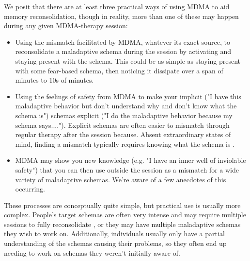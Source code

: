 \documentclass[12pt,letterpaper]{book}
\begin{document}
We posit that there are at least three practical ways of using MDMA to aid memory reconsolidation, though in reality, more than one of these may happen during any given MDMA-therapy session:
\begin{itemize}
	\item Using the mismatch facilitated by MDMA, whatever its exact source, to reconsolidate a maladaptive schema during the session by activating and staying present with the schema. This could be as simple as staying present with some fear-based schema, then noticing it dissipate over a span of minutes to 10s of minutes.
	\item Using the feelings of safety from MDMA to make your implicit ("I have this maladaptive behavior but don't understand why and don't know what the schema is") schemas explicit ("I do the maladaptive behavior because my schema says...."). Explicit schemas are often easier to mismatch through regular therapy after the session because. Absent extraordinary states of mind, finding a mismatch typically requires knowing what the schema is \cite{eckerUnlocking}.
	\item MDMA may show you new knowledge (e.g. "I have an inner well of inviolable safety") that you can then use outside the session as a mismatch for a wide variety of maladaptive schemas. We're aware of a few anecdotes of this occurring.
\end{itemize}
These processes are conceptually quite simple, but practical use is usually more complex. People's target schemas are often very intense and may require multiple sessions to fully reconsolidate \cite{mitchellMDMAClinicalTrial}, or they may have multiple maladaptive schemas they wish to work on. Additionally, individuals usually only have a partial understanding of the schemas causing their problems, so they often end up needing to work on schemas they weren't initially aware of.
\end{document}
